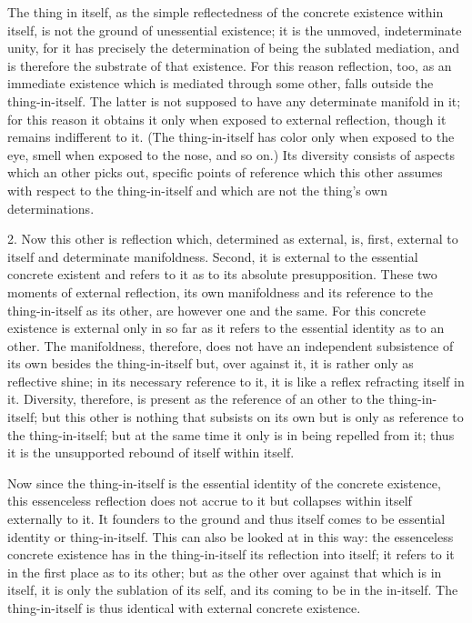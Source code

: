 The thing in itself, as the simple reflectedness of
the concrete existence within itself,
is not the ground of unessential existence;
it is the unmoved, indeterminate unity,
for it has precisely the determination of
being the sublated mediation,
and is therefore the substrate of that existence.
For this reason reflection, too,
as an immediate existence
which is mediated through some other,
falls outside the thing-in-itself.
The latter is not supposed to have
any determinate manifold in it;
for this reason it obtains it only
when exposed to external reflection,
though it remains indifferent to it.
(The thing-in-itself has color
only when exposed to the eye,
smell when exposed to the nose, and so on.)
Its diversity consists of aspects
which an other picks out,
specific points of reference
which this other assumes
with respect to the thing-in-itself
and which are not the thing's own determinations.

2. Now this other is reflection
which, determined as external, is,
first, external to itself and determinate manifoldness.
Second, it is external to the essential concrete existent
and refers to it as to its absolute presupposition.
These two moments of external reflection,
its own manifoldness and its reference to
the thing-in-itself as its other,
are however one and the same.
For this concrete existence is
external only in so far as it refers to
the essential identity as to an other.
The manifoldness, therefore, does not have
an independent  subsistence of its own
besides the thing-in-itself
but, over against it,
it is rather only as reflective shine;
in its necessary reference to it,
it is like a reflex refracting itself in it.
Diversity, therefore, is present as the reference
of an other to the thing-in-itself;
but this other is nothing that subsists on its own
but is only as reference to the thing-in-itself;
but at the same time it only is in being repelled from it;
thus it is the unsupported rebound of itself within itself.

Now since the thing-in-itself is
the essential identity of the concrete existence,
this essenceless reflection does not accrue to it
but collapses within itself externally to it.
It founders to the ground
and thus itself comes to be essential identity
or thing-in-itself.
This can also be looked at in this way:
the essenceless concrete existence has
in the thing-in-itself its reflection into itself;
it refers to it in the first place as to its other;
but as the other over against that which is in itself,
it is only the sublation of its self,
and its coming to be in the in-itself.
The thing-in-itself is thus identical
with external concrete existence.

